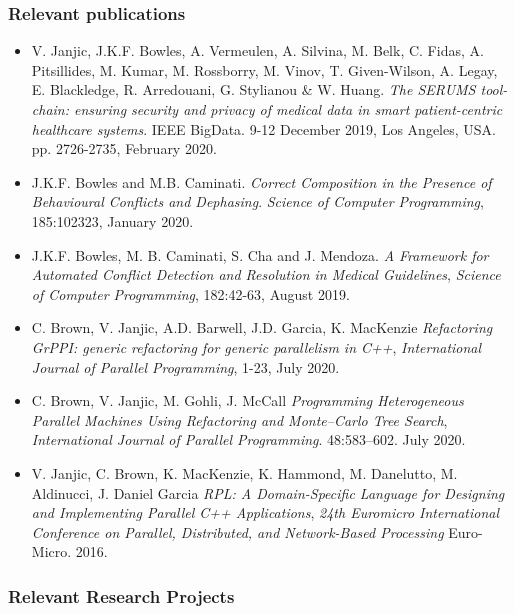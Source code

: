 \documentclass[a4paper,11pt]{article}
\begin{document}
\subsubsection*{Relevant publications}
\begin{itemize}
\item 
V. Janjic, J.K.F. Bowles, A. Vermeulen, A. Silvina, M. Belk, C. Fidas, A. Pitsillides, M. Kumar, M. Rossborry, M. Vinov, T. Given-Wilson, A. Legay, E. Blackledge, R. Arredouani, G. Stylianou \& W. Huang.
\emph{The SERUMS tool-chain: ensuring security and privacy of medical data in smart patient-centric healthcare systems}.  IEEE BigData. 9-12 December 2019, Los Angeles, USA. pp. 2726-2735, February 2020.
\item J.K.F. Bowles and M.B. Caminati.
\emph{Correct Composition in the Presence of Behavioural Conflicts and Dephasing}.  \emph{Science of Computer Programming}, 185:102323, January 2020. 
\item 
J.K.F. Bowles, M. B. Caminati, S. Cha and J. Mendoza.
\emph{A Framework for Automated Conflict Detection and Resolution in Medical Guidelines},  \emph{Science of Computer Programming}, 182:42-63, August 2019. 
\item 
C. Brown, V. Janjic, A.D. Barwell, J.D. Garcia, K. MacKenzie
\emph{Refactoring GrPPI: generic refactoring for generic parallelism in C++},
\emph{International Journal of Parallel Programming}, 1-23, July 2020.
\item 
C. Brown, V. Janjic, M. Gohli, J. McCall
\emph{Programming Heterogeneous Parallel Machines Using Refactoring and Monte–Carlo Tree Search},
\emph{International Journal of Parallel Programming}. 48:583–602. July 2020. 
\item
V. Janjic, C. Brown, K. MacKenzie, K. Hammond, M. Danelutto, M. Aldinucci, J. Daniel Garcia
\emph{RPL: A Domain-Specific Language for Designing and Implementing Parallel C++ Applications},
\emph{24th Euromicro International Conference on Parallel, Distributed, and Network-Based Processing}
Euro-Micro. 2016.
\end{itemize}

\subsubsection*{Relevant Research Projects}
\end{document}
